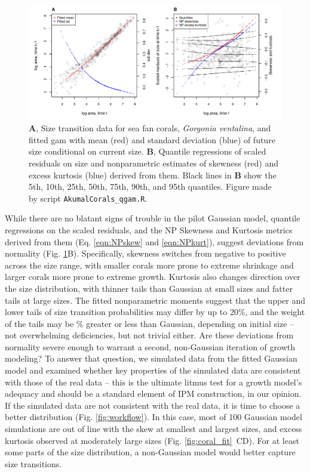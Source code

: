 \documentclass[12pt]{article}
\begin{document}
\begin{figure}[tbp]
	\centering
	\includegraphics[width=1.0\textwidth]{figures/coral_qgam_diagnostics.pdf}
	\caption{\textbf{A}, Size transition data for sea fan corals, \emph{Gorgonia ventalina}, and fitted gam with mean (red) and standard deviation (blue) of future size conditional on current size.  \textbf{B}, Quantile regressions of scaled residuals on size and nonparametric estimates of skewness (red) and excess kurtosis (blue) derived from them. Black lines in \textbf{B} show the 5th, 10th, 25th, 50th, 75th, 90th, and 95th quantiles. Figure made by script \texttt{AkumalCorals\_qgam.R}.}
	\label{fig:coral_diagnostics}
\end{figure} 

While there are no blatant signs of trouble in the pilot Gaussian model, quantile regressions on the scaled residuals, and the NP Skewness and Kurtosis metrics derived from them (Eq. \ref{eqn:NPskew} and \ref{eqn:NPkurt}), suggest deviations from normality (Fig. \ref{fig:coral_diagnostics}B).
Specifically, skewness switches from negative to positive across the size range, with smaller corals more prone to extreme shrinkage and larger corals more prone to extreme growth.  
Kurtosis also changes direction over the size distribution, with thinner tails than Gaussian at small sizes and fatter tails at large sizes. 
The fitted nonparametric moments suggest that the upper and lower tails of size transition probabilities may differ by up to 20\%, and the weight of the tails may be \% greater or less than Gaussian, depending on initial size -- not overwhelming deficiencies, but not trivial either. 
Are these deviations from normality severe enough to warrant a second, non-Gaussian iteration of growth modeling? 
To answer that question, we simulated data from the fitted Gaussian model and examined whether key properties of the simulated data are consistent with those of the real data -- this is the ultimate litmus test for a growth model's adequacy and should be a standard element of IPM construction, in our opinion.
If the simulated data are not consistent with the real data, it is time to choose a better distribution (Fig. \ref{fig:workflow}). 
In this case, most of 100 Gaussian model simulations are out of line with the skew at smallest and largest sizes, and excess kurtosis observed at moderately large sizes (Fig. \ref{fig:coral_fit}~CD). For at least some parts of the size distribution, a non-Gaussian model would better capture size transitions. 
\end{document}
